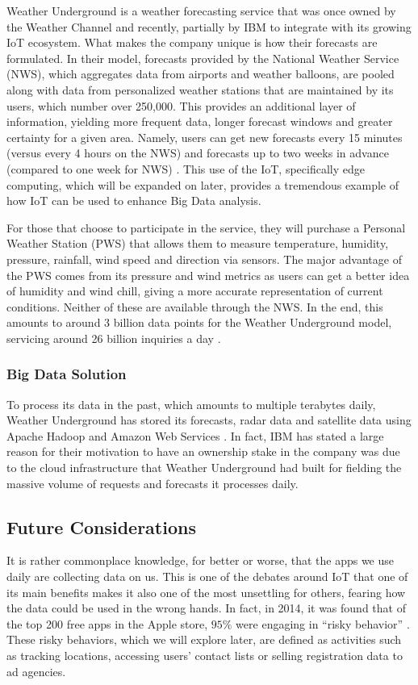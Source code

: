 \documentclass[sigconf]{acmart}
\begin{document}
Weather Underground is a weather forecasting service that was once owned by the Weather Channel and recently, partially by IBM to integrate with its growing IoT ecosystem. What makes the company unique is how their forecasts are formulated. In their model, forecasts provided by the National Weather Service (NWS), which aggregates data from airports and weather balloons, are pooled along with data from personalized weather stations that are maintained by its users, which number over 250,000. This provides an additional layer of information, yielding more frequent data, longer forecast windows and greater certainty for a given area. Namely, users can get new forecasts every 15 minutes (versus every 4 hours on the NWS) and forecasts up to two weeks in advance (compared to one week for NWS) \cite{wuabt}. This use of the IoT, specifically edge computing, which will be expanded on later, provides a tremendous example of how IoT can be used to enhance Big Data analysis. 

For those that choose to participate in the service, they will purchase a Personal Weather Station (PWS) that allows them to measure temperature, humidity, pressure, rainfall, wind speed and direction via sensors. The major advantage of the PWS comes from its pressure and wind metrics as users can get a better idea of humidity and wind chill, giving a more accurate representation of current conditions. Neither of these are available through the NWS. In the end, this amounts to around 3 billion data points for the Weather Underground model, servicing around 26 billion inquiries a day \cite{ibm}.

\subsubsection{Big Data Solution}
To process its data in the past, which amounts to multiple terabytes daily, Weather Underground has stored its forecasts, radar data and satellite data using Apache Hadoop and Amazon Web Services \cite{wuinf}. In fact, IBM has stated a large reason for their motivation to have an ownership stake in the company was due to the cloud infrastructure that Weather Underground had built for fielding the massive volume of requests and forecasts it processes daily.  

\subsection{Future Considerations}
It is rather commonplace knowledge, for better or worse, that the apps we use daily are collecting data on us. This is one of the debates around IoT that one of its main benefits makes it also one of the most unsettling for others, fearing how the data could be used in the wrong hands. In fact, in 2014, it was found that of the top 200 free apps in the Apple store, $95\%$ were engaging in ``risky behavior'' \cite{privacy}. These risky behaviors, which we will explore later, are defined as activities such as tracking locations, accessing users' contact lists or selling registration data to ad agencies.
\end{document}
